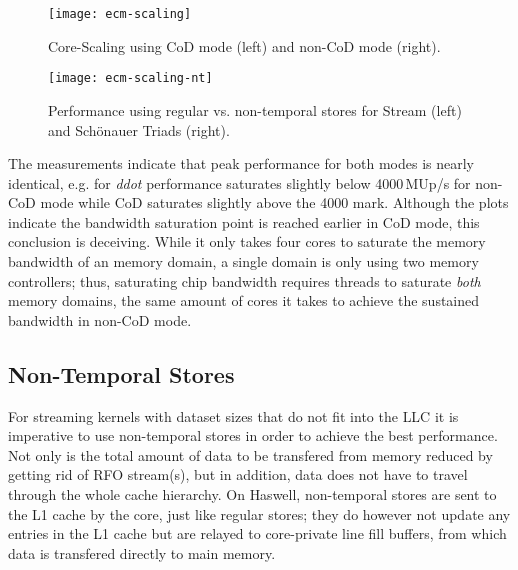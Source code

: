 \documentclass{llncs}
\begin{document}
\begin{figure}[tb]
\begin{minipage}{.49\textwidth}
    \vspace{-\baselineskip}
    \centering
    \texttt{[image: ecm-scaling]}
    \caption{Core-Scaling using \ac{CoD} mode (left) and non-\ac{CoD} mode (right).}
    \label{fig:ecm-scaling}
\end{minipage}\hfill
\begin{minipage}{.49\textwidth}
    \centering
    \texttt{[image: ecm-scaling-nt]}
    \caption{Performance using regular vs. non-temporal stores for Stream (left)
    and Sch\"onauer Triads (right).}
    \label{fig:ecm-scaling-nt}
\end{minipage}
\end{figure}

The measurements indicate that peak performance for both modes is nearly
identical, e.g. for \textit{ddot} performance saturates slightly below
4000\,MUp/s for non-\ac{CoD} mode while \ac{CoD} saturates slightly above the
4000 mark.  Although the plots indicate the bandwidth saturation point is
reached earlier in \ac{CoD} mode, this conclusion is deceiving. While it only
takes four cores to saturate the memory bandwidth of an memory domain, a single
domain is only using two memory controllers; thus, saturating chip bandwidth
requires  threads to saturate \textit{both} memory domains, the same
amount of cores it takes to achieve the sustained bandwidth in non-\ac{CoD}
mode.

\subsection{Non-Temporal Stores}

For streaming kernels with dataset sizes that do not fit into the \ac{LLC} it
is imperative to use non-temporal stores in order to achieve the best
performance.  Not only is the total amount of data to be transfered from memory
reduced by getting rid of \ac{RFO} stream(s), but in addition, data does not
have to travel through the whole cache hierarchy. On Haswell, non-temporal
stores are sent to the L1 cache by the core, just like regular stores; they do
however not update any entries in the L1 cache but are relayed to core-private
line fill buffers, from which data is transfered directly to main memory.
\end{document}

